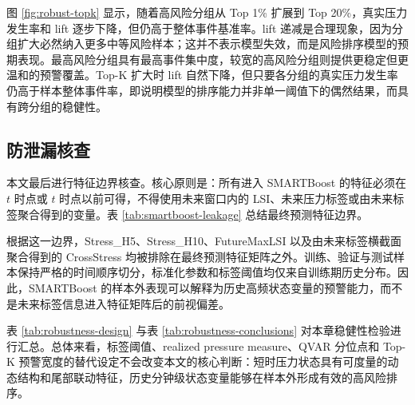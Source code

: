 图 \ref{fig:robust-topk} 显示，随着高风险分组从 Top 1\% 扩展到 Top 20\%，真实压力发生率和 lift 逐步下降，但仍高于整体事件基准率。lift 递减是合理现象，因为分组扩大必然纳入更多中等风险样本；这并不表示模型失效，而是风险排序模型的预期表现。最高风险分组具有最高事件集中度，较宽的高风险分组则提供更稳定但更温和的预警覆盖。Top-K 扩大时 lift 自然下降，但只要各分组的真实压力发生率仍高于样本整体事件率，即说明模型的排序能力并非单一阈值下的偶然结果，而具有跨分组的稳健性。

\subsection{防泄漏核查}

本文最后进行特征边界核查。核心原则是：所有进入 SMARTBoost 的特征必须在 \(t\) 时点或 \(t\) 时点以前可得，不得使用未来窗口内的 LSI、未来压力标签或由未来标签聚合得到的变量。表 \ref{tab:smartboost-leakage} 总结最终预测特征边界。



根据这一边界，Stress\_H5、Stress\_H10、FutureMaxLSI 以及由未来标签横截面聚合得到的 CrossStress 均被排除在最终预测特征矩阵之外。训练、验证与测试样本保持严格的时间顺序切分，标准化参数和标签阈值均仅来自训练期历史分布。因此，SMARTBoost 的样本外表现可以解释为历史高频状态变量的预警能力，而不是未来标签信息进入特征矩阵后的前视偏差。



表 \ref{tab:robustness-design} 与表 \ref{tab:robustness-conclusions} 对本章稳健性检验进行汇总。总体来看，标签阈值、realized pressure measure、QVAR 分位点和 Top-K 预警宽度的替代设定不会改变本文的核心判断：短时压力状态具有可度量的动态结构和尾部联动特征，历史分钟级状态变量能够在样本外形成有效的高风险排序。

\FloatBarrier
